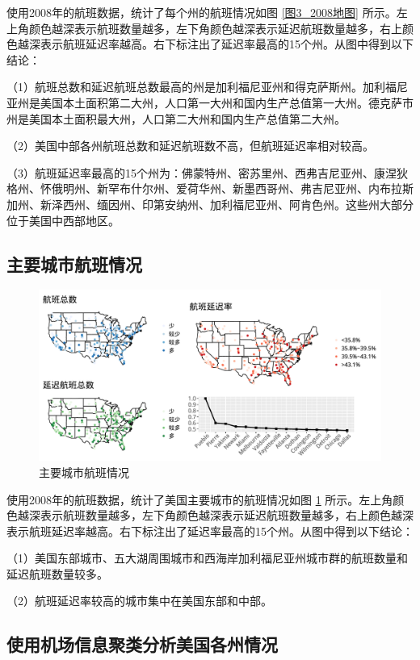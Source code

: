\documentclass[12pt,a4paper,onecolumn]{article}
\begin{document}
使用2008年的航班数据，统计了每个州的航班情况如图 \ref{图3_2008地图} 所示。左上角颜色越深表示航班数量越多，左下角颜色越深表示延迟航班数量越多，右上颜色越深表示航班延迟率越高。右下标注出了延迟率最高的15个州。从图中得到以下结论：

（1）航班总数和延迟航班总数最高的州是加利福尼亚州和得克萨斯州。加利福尼亚州是美国本土面积第二大州，人口第一大州和国内生产总值第一大州。德克萨市州是美国本土面积最大州，人口第二大州和国内生产总值第二大州。

（2）美国中部各州航班总数和延迟航班数不高，但航班延迟率相对较高。

（3）航班延迟率最高的15个州为：佛蒙特州、密苏里州、西弗吉尼亚州、康涅狄格州、怀俄明州、新罕布什尔州、爱荷华州、新墨西哥州、弗吉尼亚州、内布拉斯加州、新泽西州、缅因州、印第安纳州、加利福尼亚州、阿肯色州。这些州大部分位于美国中西部地区。

\subsection{主要城市航班情况}

\begin{figure}[H]
	\centering
	\includegraphics[width=400pt]{图4_2008地图.pdf}
	\caption{主要城市航班情况}
  \label{图4_2008地图}
\end{figure}

使用2008年的航班数据，统计了美国主要城市的航班情况如图 \ref{图4_2008地图} 所示。左上角颜色越深表示航班数量越多，左下角颜色越深表示延迟航班数量越多，右上颜色越深表示航班延迟率越高。右下标注出了延迟率最高的15个州。从图中得到以下结论：

（1）美国东部城市、五大湖周围城市和西海岸加利福尼亚州城市群的航班数量和延迟航班数量较多。

（2）航班延迟率较高的城市集中在美国东部和中部。

\subsection{使用机场信息聚类分析美国各州情况}
\end{document}

